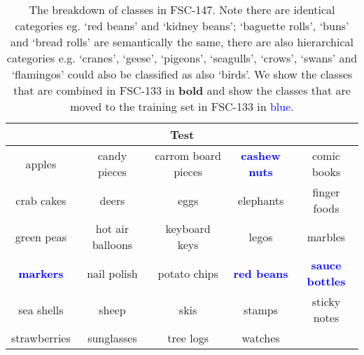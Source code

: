 \documentclass[letterpaper, 11pt]{IEEEtran}
\begin{document}
\begin{table*}[!ht]
\begin{tabular}{ccccc}
\midrule
\multicolumn{5}{c}{Test} \\
\midrule
apples&candy pieces&carrom board pieces&\textbf{\textcolor{blue}{cashew nuts}}&comic books\\
crab cakes&deers&eggs&elephants&finger foods\\
green peas&hot air balloons&keyboard keys&legos&marbles\\
\textbf{\textcolor{blue}{markers}}&nail polish&potato chips&\textbf{\textcolor{blue}{red beans}}&\textbf{\textcolor{blue}{sauce bottles}}\\
sea shells&sheep&skis&stamps&sticky notes\\
strawberries&sunglasses&tree logs&watches\\

\bottomrule
\end{tabular}     \caption{The breakdown of classes in FSC-147. 
    Note there are identical categories eg. `red beans' and `kidney beans'; `baguette rolls', `buns' and `bread rolls' are semantically the same, there are also hierarchical categories e.g. `cranes', `geese', `pigeons', `seagulls', `crows', `swans' and `flamingos' could also be classified as also `birds'. 
    We show the classes that are combined in FSC-133 in \textbf{bold} and show the classes that are moved to the training set in FSC-133 in \textcolor{blue}{blue}.}
    \label{classes_old_table}
\end{table*}

\clearpage
\end{document}
